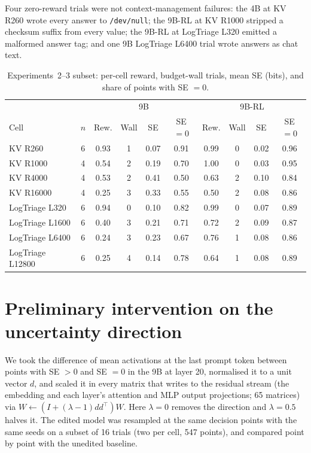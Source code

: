 \documentclass{article}
\begin{document}
Four zero-reward trials were not context-management failures: the 4B at KV R260 wrote every answer to \texttt{/dev/null}; the 9B-RL at KV R1000 stripped a checksum suffix from every value; the 9B-RL at LogTriage L320 emitted a malformed answer tag; and one 9B LogTriage L6400 trial wrote answers as chat text.

\begin{table}[!ht]
  \centering
  \small
  \caption{Experiments~2--3 subset: per-cell reward, budget-wall trials, mean SE (bits), and share of points with SE $=0$.}
  \begin{tabular}{@{}lc|cccc|cccc@{}}
    \toprule
    & & \multicolumn{4}{c}{9B} & \multicolumn{4}{c}{9B-RL} \\
    Cell & $n$ & Rew. & Wall & SE & SE$=0$ & Rew. & Wall & SE & SE$=0$ \\
    \midrule
    KV R260 & 6 & 0.93 & 1 & 0.07 & 0.91 & 0.99 & 0 & 0.02 & 0.96 \\
    KV R1000 & 4 & 0.54 & 2 & 0.19 & 0.70 & 1.00 & 0 & 0.03 & 0.95 \\
    KV R4000 & 4 & 0.53 & 2 & 0.41 & 0.50 & 0.63 & 2 & 0.10 & 0.84 \\
    KV R16000 & 4 & 0.25 & 3 & 0.33 & 0.55 & 0.50 & 2 & 0.08 & 0.86 \\
    LogTriage L320 & 6 & 0.94 & 0 & 0.10 & 0.82 & 0.99 & 0 & 0.07 & 0.89 \\
    LogTriage L1600 & 6 & 0.40 & 3 & 0.21 & 0.71 & 0.72 & 2 & 0.09 & 0.87 \\
    LogTriage L6400 & 6 & 0.24 & 3 & 0.23 & 0.67 & 0.76 & 1 & 0.08 & 0.86 \\
    LogTriage L12800 & 6 & 0.25 & 4 & 0.14 & 0.78 & 0.64 & 1 & 0.08 & 0.89 \\
    \bottomrule
  \end{tabular}
\end{table}

\section{Preliminary intervention on the uncertainty direction}
\label{app:h3}

We took the difference of mean activations at the last prompt token between points with SE $>0$ and SE $=0$ in the 9B at layer 20, normalised it to a unit vector $d$, and scaled it in every matrix that writes to the residual stream (the embedding and each layer's attention and MLP output projections; 65 matrices) via $W \leftarrow (I + (\lambda-1)dd^\top)W$.
Here $\lambda=0$ removes the direction and $\lambda=0.5$ halves it.
The edited model was resampled at the same decision points with the same seeds on a subset of 16 trials (two per cell, 547 points), and compared point by point with the unedited baseline.
\end{document}
